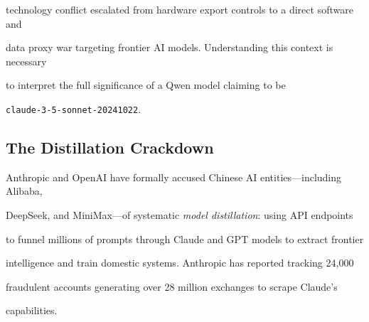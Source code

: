 technology conflict escalated from hardware export controls to a direct software and





data proxy war targeting frontier AI models. Understanding this context is necessary





to interpret the full significance of a Qwen model claiming to be





\texttt{claude-3-5-sonnet-20241022}.











\subsection{The Distillation Crackdown}











Anthropic and OpenAI have formally accused Chinese AI entities---including Alibaba,





DeepSeek, and MiniMax---of systematic \emph{model distillation}: using API endpoints





to funnel millions of prompts through Claude and GPT models to extract frontier





intelligence and train domestic systems. Anthropic has reported tracking 24,000





fraudulent accounts generating over 28 million exchanges to scrape Claude's





capabilities.











